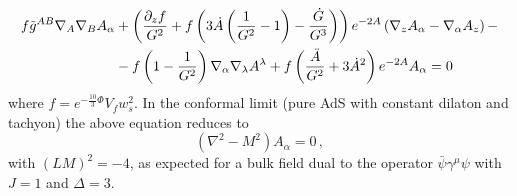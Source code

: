 \documentclass[a4paper,12pt]{article}
\begin{document}
\begin{align}
f \tilde{g}^{AB} \nabla_A \nabla_B A_\alpha & + \left( \frac{\partial_z f}{G^2} + f  \left( 3 \dot{A} \left(  \frac{1}{G^2} - 1\right) - \frac{\dot{G}}{G^3} \right)  \right) e^{-2 A} \left(\nabla_z A_\alpha - \nabla_\alpha A_z \right) - \notag \\
&- f \left( 1 - \frac{1}{G^2} \right) \nabla_\alpha \nabla_\lambda A^\lambda + f \left( \frac{\ddot{A}}{G^2} + 3 \dot{A}^2  \right) e^{-2 A} A_\alpha = 0 \, 
\end{align}
where $f = e^{-\frac{10}{3} \Phi} V_f w_s^2$. In the conformal limit (pure AdS with constant dilaton and tachyon) the above equation reduces to
\begin{equation}
\left( \nabla^2 - M^2 \right) A_\alpha = 0 \, ,
\end{equation}
with ${\left( L M \right)}^2= - 4$, as expected for a bulk field dual to the operator $\bar{\psi} \gamma^\mu \psi$ with $J = 1$ and $\Delta = 3$.

\end{document}
